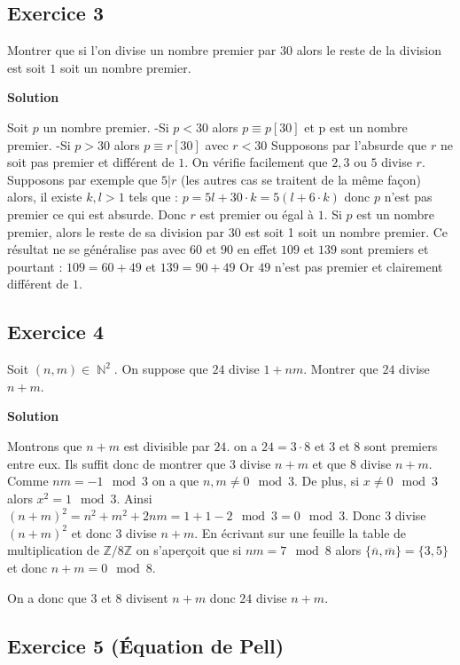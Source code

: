 \documentclass{article}
\DeclareMathOperator{\N}{\mathbb{N}}
\begin{document}
\subsection*{Exercice 3} 

Montrer que si l'on divise un nombre premier par $30$ alors le reste de la division est soit $1$ soit un nombre premier. 

\textbf{Solution} 

Soit $p$ un nombre premier.
-Si $p < 30$ alors $ p\equiv p [30] $ et p est un nombre premier.
-Si $p > 30$ alors $p\equiv r[30]$ avec $r<30$
Supposons par l'absurde que $r$ ne soit pas premier et différent de $1$. On vérifie facilement que $2, 3$ ou $5$ divise $r$. Supposons par exemple que $5 | r$ (les autres cas se traitent de la même façon) alors, il existe $k, l > 1$ tels que :
$p = 5l + 30\cdot k = 5(l + 6\cdot k)$ donc $p $ n'est pas premier ce qui est absurde. Donc $r$ est premier ou égal à $1$.
Si $p$ est un nombre premier, alors le reste de sa division par 30 est soit 1 soit un nombre premier.
Ce résultat ne se généralise pas avec $60$ et $90$ en effet $109$ et $139$ sont premiers et pourtant :
$109 = 60 + 49 $ et $139 = 90 + 49$
Or $49$ n'est pas premier et clairement différent de $1$. 

\subsection*{Exercice 4} 

Soit $(n, m) \in \N^2$. On suppose que $24$ divise $1+nm$. Montrer que $24$ divise $n+m$. 

\textbf{Solution} 

Montrons que $n+m$ est divisible par $24$. on a $24 = 3\cdot 8$ et $3$ et $8$ sont premiers entre eux. Ils suffit donc de montrer que $3$ divise $n+m$ et que $8$ divise $n+m$.
Comme $nm = -1 \mod 3 $ on a que $n, m \neq 0 \mod 3$. De plus, si $x \neq 0 \mod 3$ alors $x^2 = 1 \mod 3$. Ainsi $(n+m)^2 = n^2 + m^2 + 2nm = 1 + 1 - 2 \mod 3 = 0 \mod 3$. Donc $3$ divise $(n+m)^2$ et donc $3$ divise $n+m$.
En écrivant sur une feuille la table de multiplication de $\mathbb{Z}/8\mathbb{Z}$ on s'aperçoit que si $nm = 7 \mod 8$ alors $\{\overline{n}, \overline{m} \} = \{ 3, 5\}$ et donc $n+m = 0 \mod 8$. 

On a donc que $3$ et $8$ divisent $n+m$ donc $24$ divise $n+m$. 

\subsection*{Exercice 5 (Équation de Pell)} 
\end{document}
